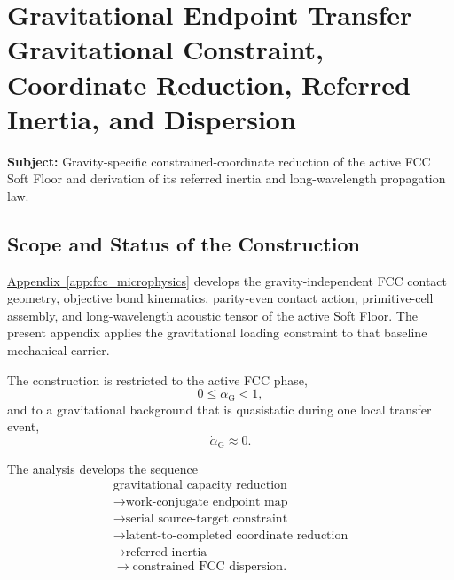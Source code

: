 \chapter[Gravitational Endpoint Transfer of the Active FCC Vacuum]{Gravitational Endpoint Transfer\\[0.5ex]
\Large Gravitational Constraint, Coordinate Reduction, Referred Inertia, and Dispersion}
\label{app:gravitational_endpoint_transfer}

\noindent\textbf{Subject:}
Gravity-specific constrained-coordinate reduction of the active FCC Soft Floor and derivation of its referred inertia and long-wavelength propagation law.

\section{Scope and Status of the Construction}
\label{sec:grav_endpoint_scope}

\hyperref[app:fcc_microphysics]{Appendix~\ref*{app:fcc_microphysics}} develops the gravity-independent FCC contact geometry, objective bond kinematics, parity-even contact action, primitive-cell assembly, and long-wavelength acoustic tensor of the active Soft Floor. The present appendix applies the gravitational loading constraint to that baseline mechanical carrier.

The construction is restricted to the active FCC phase,
\begin{equation}
    0 \leq \alpha_{\mathrm{G}} < 1,
\end{equation}
and to a gravitational background that is quasistatic during one local transfer event,
\begin{equation}
    \dot{\alpha}_{\mathrm{G}} \approx 0.
\end{equation}

The analysis develops the sequence
\begin{equation}
\begin{array}{c}
    \text{gravitational capacity reduction} \\
    \longrightarrow
    \text{work-conjugate endpoint map} \\
    \longrightarrow
    \text{serial source-target constraint} \\
    \longrightarrow
    \text{latent-to-completed coordinate reduction} \\
    \longrightarrow
    \text{referred inertia} \\
    \longrightarrow
    \text{constrained FCC dispersion}.
\end{array}
\end{equation}

